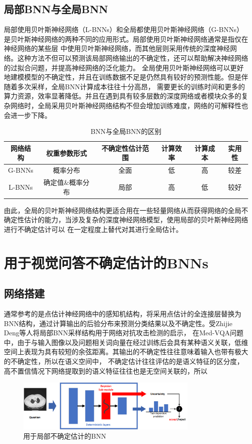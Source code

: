 \subsection{局部BNN与全局BNN}
局部使用贝叶斯神经网络（L-BNNs）和全局都使用贝叶斯神经网络（G-BNNs）是贝叶斯神经网络的两种不同的应用形式。局部使用贝叶斯神经网络通常是指仅在神经网络的某些层
中使用贝叶斯神经网络，而其他层则采用传统的深度神经网络。这种方法不但可以预测该局部网络输出的不确定性，还可以帮助解决神经网络的过拟合问题，并提高神经网络的泛化能力。
全局使用贝叶斯神经网络可以更好地建模模型的不确定性，并且在训练数据不足是仍然具有较好的预测性能。但是伴随着多次采样，全局BNN计算成本往往十分高昂，
需要更长的训练时间和更多的算力资源，效率显著降低。并且在遇到具有较多层数的深度网络或者模块众多的复杂网络时，全局采用贝叶斯神经网络结构不但会增加训练难度，网络的可解释性也会进一步下降。
\begin{table}
	\caption{\label{bnn-bnnlr}BNN与全局BNN的区别}
	\centering
	\small %
	\begin{tabular}{c|ccccc}
        \hline 网络结构 & 权重参数形式 & 不确定性估计范围 & 计算效率 & 计算成本 &实用性\\
        \hline G-BNNs & 概率分布 & 全面 & 低 & 高 & 较差\\
		L-BNNs & 确定值\&概率分布 & 局部 & 高 & 低 & 较好\\
        \hline 
        \end{tabular}
\end{table}	
由此，全局的贝叶斯神经网络结构更适合用在一些轻量网络从而获得网络的全局不确定性估计的能力，当涉及复杂的深度神经网络模型，使用局部的贝叶斯神经网络进行不确定估计可以
在一定程度上替代对其进行全局估计。

\section{用于视觉问答不确定估计的BNNs}
\subsection{网络搭建}
通常参考的是点估计神经网络中的感知机结构，将采用点估计的全连接层替换为BNN结构，通过计算输出的后验分布来预测分类结果以及不确定性。受Zhijie Deng等人\cite{deng2021libre}将局部BNN采样结构用于网络对抗攻击检测的启示，
在Med-VQA问题中，由于与输入图像以及问题相关词向量在经过训练后会具有某种语义关联，低维空间上表现为具有较短的余弦距离。其输出的不确定性往往意味着输入也带有极大的不确定性，所以在语义空间中，
不确定估计往往评估的是语义特征的区分度，高不置信情况下网络提取到的语义特征往往也是无空间关联的，所以
\begin{figure}[htbp]
	\centering	
	\includegraphics[width=0.8\textwidth]{Fig/myfig/chapter4/bnn-sublayer.png}  %
	\caption{\label{bnn-sublayer}用于局部不确定估计的BNN} 
\end{figure}
